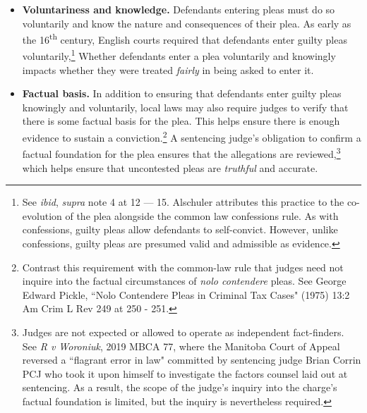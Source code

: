 \begin{itemize}
\item \textbf{Voluntariness and knowledge.} Defendants entering pleas must do so voluntarily and know the nature and consequences of their plea. As early as the 16\textsuperscript{th} century, English courts required that defendants enter guilty pleas voluntarily,\footnote{See \textit{ibid}, \textit{supra} note 4 at 12 — 15. Alschuler attributes this practice to the co-evolution of the plea alongside the common law confessions rule. As with confessions, guilty pleas allow defendants to self-convict. However, unlike confessions, guilty pleas are presumed valid and admissible as evidence.} Whether defendants enter a plea voluntarily and knowingly impacts whether they were treated \textit{fairly} in being asked to enter it.
\item \textbf{Factual basis.} In addition to ensuring that defendants enter guilty pleas knowingly and voluntarily, local laws may also require judges to verify that there is some factual basis for the plea. This helps ensure there is enough evidence to sustain a conviction.\footnote{Contrast this requirement with the common-law rule that judges need not inquire into the factual circumstances of \textit{nolo contendere} pleas. See George Edward Pickle, ``Nolo Contendere Pleas in Criminal Tax Cases" (1975) 13:2 Am Crim L Rev 249 at 250 - 251.} A sentencing judge's obligation to confirm a factual foundation for the plea ensures that the allegations are reviewed,\footnote{Judges are not expected or allowed to operate as independent fact-finders. See \textit{R v Woroniuk}, 2019 MBCA 77, where the Manitoba Court of Appeal reversed a ``flagrant error in law" committed by sentencing judge Brian Corrin PCJ who took it upon himself to investigate the factors counsel laid out at sentencing. As a result, the scope of the judge's inquiry into the charge's factual foundation is limited, but the inquiry is nevertheless required.} which helps ensure that uncontested pleas are \textit{truthful} and accurate.

\end{itemize}
